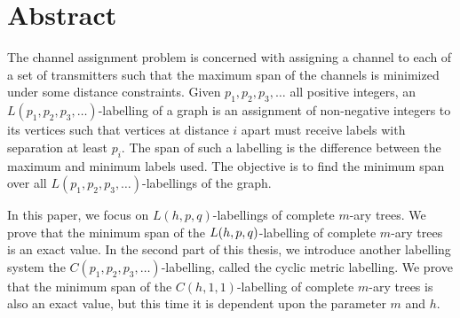 \chapter*{\centering Abstract}

The channel assignment problem is concerned with assigning a channel to each of a set of transmitters such that the maximum span of the channels is minimized under some distance constraints. Given $p_1, p_2, p_3, \dots$ all positive integers, an $L(p_1, p_2, p_3,\dots)$-labelling of a graph is an assignment of non-negative integers to its vertices such that vertices at distance $i$ apart must receive labels with separation at least $p_i$. The span of such a labelling is the difference between the maximum and minimum labels used. The objective is to find the minimum span over all $L(p_1, p_2, p_3, \dots)$-labellings of the graph. 

In this paper, we focus on $L(h,p,q)$-labellings of complete $m$-ary trees. We prove that the minimum span of the $L(h,p,q)$-labelling of complete $m$-ary trees is an exact value. In the second part of this thesis, we introduce another labelling system the $C(p_1,p_2,p_3, \dots)$-labelling, called the cyclic metric labelling. We prove that the minimum span of the $C(h,1,1)$-labelling of complete $m$-ary trees is also an exact value, but this time it is dependent upon the parameter $m$ and $h$. 